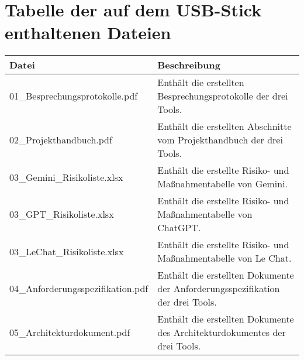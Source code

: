 \section*{Tabelle der auf dem USB-Stick enthaltenen Dateien} \label{BeigelegteDateien}

\begin{longtable}{|p{5cm}|p{10cm}|}
    \hline
    \textbf{Datei} & \textbf{Beschreibung} \\
    \hline
    \endfirsthead

    01\_Besprechungsprotokolle.pdf & Enthält die erstellten Besprechungsprotokolle der drei Tools. \\
    \hline
    02\_Projekthandbuch.pdf & Enthält die erstellten Abschnitte vom Projekthandbuch der drei Tools. \\
    \hline
    03\_Gemini\_Risikoliste.xlsx & Enthält die erstellte Risiko- und Maßnahmentabelle von Gemini. \\
    \hline
    03\_GPT\_Risikoliste.xlsx & Enthält die erstellte Risiko- und Maßnahmentabelle von ChatGPT. \\
    \hline
    03\_LeChat\_Risikoliste.xlsx & Enthält die erstellte Risiko- und Maßnahmentabelle von Le Chat. \\
    \hline
    04\_Anforderungsspezifikation.pdf & Enthält die erstellten Dokumente der Anforderungsspezifikation der drei Tools. \\
    \hline
    05\_Architekturdokument.pdf & Enthält die erstellten Dokumente des Architekturdokumentes der drei Tools. \\
    \hline

\end{longtable}

\cleardoublepage


\printglossary[type=\acronymtype]
\printglossary

\listoffigures
\cleardoublepage 

\listoftables
\cleardoublepage 

\renewcommand\lstlistlistingname{Quellcodeverzeichnis} 
\lstlistoflistings 
\renewcommand*\lstlistingname{Quellcode}
\cleardoublepage 

\renewcommand{\indexname}{Stichwortverzeichnis}
\printindex
\cleardoublepage 

\printbibliography
\cleardoublepage 